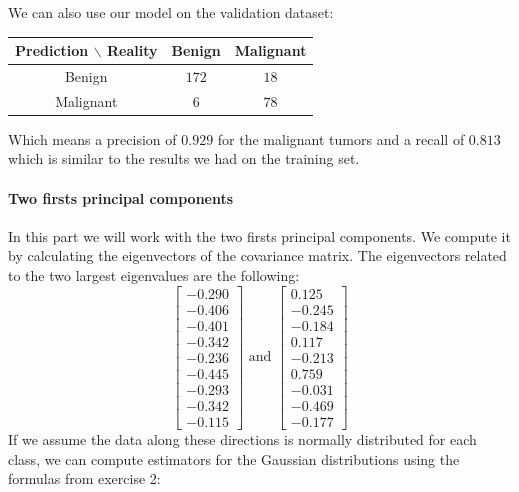 \documentclass[a4paper, 10pt]{article}
\begin{document}
We can also use our model on the validation dataset:
\begin{center}
    \begin{tabular}{ |c|c|c| }
        \hline
        Prediction $\backslash$ Reality & Benign & Malignant \\
        \hline
        Benign & $172$ & $18$ \\
        \hline
        Malignant & $6$ & $78$ \\ 
        \hline
    \end{tabular}
\end{center}
Which means a precision of $0.929$ for the malignant tumors and a recall of $0.813$ which is similar to
the results we had on the training set.

\paragraph{Two firsts principal components}
In this part we will work with the two firsts principal components. We compute it by calculating the
eigenvectors of the covariance matrix. The eigenvectors related to the two largest eigenvalues are the following:
$$
\begin{bmatrix}
    -0.290\\
    -0.406\\
    -0.401\\
    -0.342\\
    -0.236\\
    -0.445\\
    -0.293\\
    -0.342\\
    -0.115
\end{bmatrix}\text{ and } \begin{bmatrix}
    0.125\\
   -0.245\\
   -0.184\\
    0.117\\
   -0.213\\
    0.759\\
   -0.031\\
   -0.469\\
   -0.177
\end{bmatrix}
$$
If we assume the data along these directions is normally distributed for each class, we can compute
estimators for the Gaussian distributions using the formulas from exercise 2:
\end{document}
